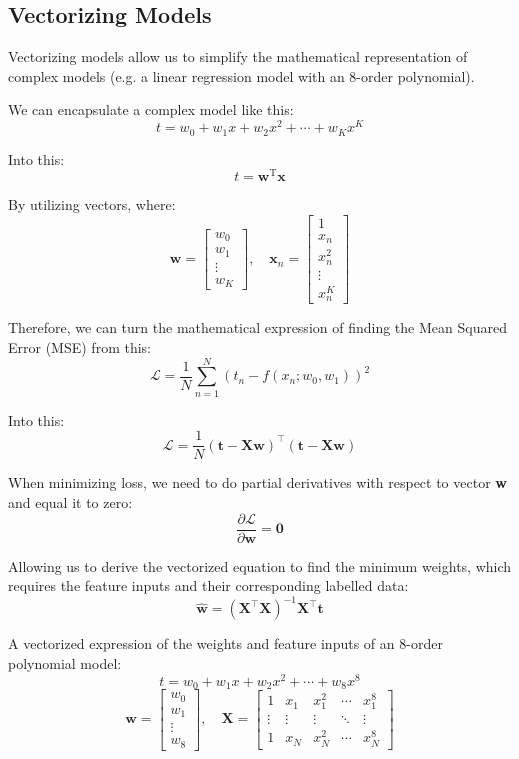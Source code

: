 \documentclass[12pt]{article}
\begin{document}
\newpage
\subsection{Vectorizing Models}
Vectorizing models allow us to simplify the mathematical representation of complex models (e.g. a linear regression model with an 8-order polynomial).

We can encapsulate a complex model like this: 
\[
t = w_0 + w_1 x + w_2 x^2 + \cdots + w_K x^K
\]

Into this:
\[
t = \mathbf{w}^\mathrm{T} \mathbf{x}
\]

By utilizing vectors, where:
\[
\mathbf{w} = \begin{bmatrix} w_0 \\ w_1 \\ \vdots \\ w_K \end{bmatrix},
\quad
\mathbf{x}_n = \begin{bmatrix} 1 \\ x_n \\ x_n^2 \\ \vdots \\ x_n^K \end{bmatrix}
\]

\vspace{2.5em}
Therefore, we can turn the mathematical expression of finding the Mean Squared Error (MSE) from this:
\[
\mathcal{L} = \frac{1}{N} \sum_{n=1}^{N} \left(t_n - f(x_n; w_0, w_1)\right)^2
\]

Into this:
\[
\mathcal{L} = \frac{1}{N} (\mathbf{t} - \mathbf{X}\mathbf{w})^\top (\mathbf{t} - \mathbf{X}\mathbf{w})
\]

\vspace{2.5em}
When minimizing loss, we need to do partial derivatives with respect to vector \textbf{w} and equal it to zero:
\[
\frac{\partial \mathcal{L}}{\partial \mathbf{w}} = \mathbf{0}
\]

\vspace{1.25em}
Allowing us to derive the vectorized equation to find the minimum weights, which requires the feature inputs and their corresponding labelled data:
\[
\hat{\mathbf{w}} = (\mathbf{X}^\top \mathbf{X})^{-1} \mathbf{X}^\top \mathbf{t}
\]

\vspace{2.5em}
A vectorized expression of the weights and feature inputs of an 8-order polynomial model:
\[
t = w_0 + w_1 x + w_2 x^2 + \cdots + w_8 x^8
\]
\[
\mathbf{w} = \begin{bmatrix} w_0 \\ w_1 \\ \vdots \\ w_8\end{bmatrix}
,\quad
\mathbf{X} = \begin{bmatrix} 1 & x_1 & x_1^2 & \cdots & x_1^8 \\ \vdots & \vdots & \vdots & \ddots & \vdots \\ 1 & x_N & x_N^2 & \cdots & x_N^8 \end{bmatrix}
\]
\end{document}
